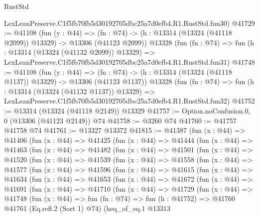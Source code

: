 \begin{lexlean}{RustStd}
\begin{coremodule}
    LexLeanPreserve.C1f5fb70fb5d30192705dbc25a7d0efb4.R1.RustStd.fun30)
@41729 := @41108
    (fun (y : @44) =>
    (fn : @74) -> (h : @13314 (@13324 (@41118 @2099)) @13329) -> @13306 (@41123 @2099))
    @13328
    (fun (fn : @74) =>
    fun (h : @13314 (@13324 (@41132 @2099)) @13329) =>
    LexLeanPreserve.C1f5fb70fb5d30192705dbc25a7d0efb4.R1.RustStd.fun31)
@41748 := @41108
    (fun (y : @44) =>
    (fn : @74) -> (h : @13314 (@13324 (@41118 @1137)) @13329) -> @13306 (@41123 @1137))
    @13328
    (fun (fn : @74) =>
    fun (h : @13314 (@13324 (@41132 @1137)) @13329) =>
    LexLeanPreserve.C1f5fb70fb5d30192705dbc25a7d0efb4.R1.RustStd.fun32)
@41752 := @13314 (@13324 (@41118 @2149)) @13329
@41757 := Option.noConfusion.{0, 0} (@13306 (@41123 @2149)) @74
@41758 := @3260 @74
@41760 := @41757 @41758 @74
@41761 := @13327 @13372
@41815 := @41387
    (fun (x : @44) =>
    @41406
      (fun (x : @44) =>
      @41425
        (fun (x : @44) =>
        @41444
          (fun (x : @44) =>
          @41463
            (fun (x : @44) =>
            @41482
              (fun (x : @44) =>
              @41501
                (fun (x : @44) =>
                @41520
                  (fun (x : @44) =>
                  @41539
                    (fun (x : @44) =>
                    @41558
                      (fun (x : @44) =>
                      @41577
                        (fun (x : @44) =>
                        @41596
                          (fun (x : @44) =>
                          @41615
                            (fun (x : @44) =>
                            @41634
                              (fun (x : @44) =>
                              @41653
                                (fun (x : @44) =>
                                @41672
                                  (fun (x : @44) =>
                                  @41691
                                    (fun (x : @44) =>
                                    @41710
                                      (fun (x : @44) =>
                                      @41729
                                        (fun (x : @44) =>
                                        @41748
                                          (fun (x : @44) =>
                                          fun (fn : @74) =>
                                          fun (h : @41752) =>
                                          @41760
                                            @41761
                                            (Eq.refl.{2} (Sort 1) @74)
                                            (heq_of_eq.{1}
                                              @13313

\end{coremodule}
\end{lexlean}
